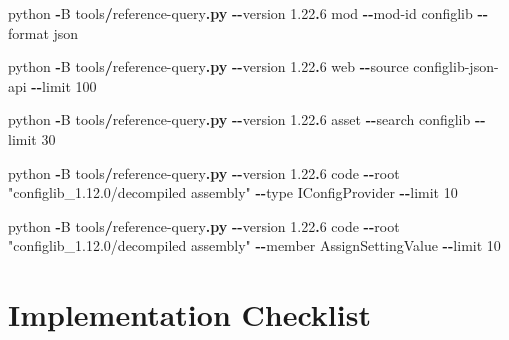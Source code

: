 \documentclass[
  11pt,
  letterpaper,
  titlepage]{article}
\newenvironment{Shaded}{\begin{snugshade}}{\end{snugshade}}
\newcommand{\DataTypeTok}[1]{\textcolor[rgb]{0.13,0.29,0.53}{#1}}
\newcommand{\DecValTok}[1]{\textcolor[rgb]{0.00,0.00,0.81}{#1}}
\newcommand{\FunctionTok}[1]{\textcolor[rgb]{0.13,0.29,0.53}{\textbf{#1}}}
\newcommand{\NormalTok}[1]{#1}
\newcommand{\OperatorTok}[1]{\textcolor[rgb]{0.81,0.36,0.00}{\textbf{#1}}}
\newcommand{\StringTok}[1]{\textcolor[rgb]{0.31,0.60,0.02}{#1}}
\begin{document}
\begin{Shaded}
\begin{Highlighting}[]
\NormalTok{python }\OperatorTok{{-}}\NormalTok{B tools}\OperatorTok{/}\NormalTok{reference{-}query}\OperatorTok{.}\FunctionTok{py} \OperatorTok{{-}{-}}\NormalTok{version }\DecValTok{1.22}\OperatorTok{.}\DecValTok{6}\NormalTok{ \textasciigrave{}}
\NormalTok{  mod }\OperatorTok{{-}{-}}\NormalTok{mod{-}id configlib }\OperatorTok{{-}{-}}\NormalTok{format json}

\NormalTok{python }\OperatorTok{{-}}\NormalTok{B tools}\OperatorTok{/}\NormalTok{reference{-}query}\OperatorTok{.}\FunctionTok{py} \OperatorTok{{-}{-}}\NormalTok{version }\DecValTok{1.22}\OperatorTok{.}\DecValTok{6}\NormalTok{ \textasciigrave{}}
\NormalTok{  web }\OperatorTok{{-}{-}}\NormalTok{source configlib{-}json{-}api }\OperatorTok{{-}{-}}\NormalTok{limit }\DecValTok{100}

\DataTypeTok{python} \OperatorTok{{-}}\NormalTok{B tools}\OperatorTok{/}\NormalTok{reference{-}query}\OperatorTok{.}\FunctionTok{py} \OperatorTok{{-}{-}}\NormalTok{version }\DecValTok{1.22}\OperatorTok{.}\DecValTok{6}\NormalTok{ \textasciigrave{}}
\NormalTok{  asset }\OperatorTok{{-}{-}}\NormalTok{search configlib }\OperatorTok{{-}{-}}\NormalTok{limit }\DecValTok{30}

\DataTypeTok{python} \OperatorTok{{-}}\NormalTok{B tools}\OperatorTok{/}\NormalTok{reference{-}query}\OperatorTok{.}\FunctionTok{py} \OperatorTok{{-}{-}}\NormalTok{version }\DecValTok{1.22}\OperatorTok{.}\DecValTok{6}\NormalTok{ \textasciigrave{}}
\NormalTok{  code }\OperatorTok{{-}{-}}\NormalTok{root }\StringTok{"configlib\_1.12.0/decompiled assembly"}\NormalTok{ \textasciigrave{}}
  \OperatorTok{{-}{-}}\NormalTok{type IConfigProvider }\OperatorTok{{-}{-}}\NormalTok{limit }\DecValTok{10}

\DataTypeTok{python} \OperatorTok{{-}}\NormalTok{B tools}\OperatorTok{/}\NormalTok{reference{-}query}\OperatorTok{.}\FunctionTok{py} \OperatorTok{{-}{-}}\NormalTok{version }\DecValTok{1.22}\OperatorTok{.}\DecValTok{6}\NormalTok{ \textasciigrave{}}
\NormalTok{  code }\OperatorTok{{-}{-}}\NormalTok{root }\StringTok{"configlib\_1.12.0/decompiled assembly"}\NormalTok{ \textasciigrave{}}
  \OperatorTok{{-}{-}}\NormalTok{member AssignSettingValue }\OperatorTok{{-}{-}}\NormalTok{limit }\DecValTok{10}
\end{Highlighting}
\end{Shaded}

\section{Implementation Checklist}\label{implementation-checklist}
\end{document}
